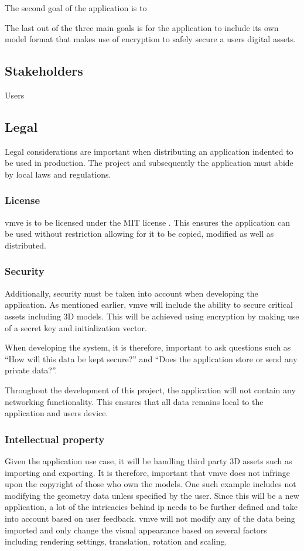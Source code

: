 \documentclass[11pt]{article}
\begin{document}
The second goal of the application is to 


The last out of the three main goals is for the application to include its own
model format that makes use of encryption to safely secure a users digital
assets.


\subsection{Stakeholders}
Users



\subsection{Legal}
Legal considerations are important when distributing an application indented to
be used in production. The project and subsequently the application must abide by
local laws and regulations.

\subsubsection{License}
\gls{vmve} is to be licensed under the MIT license \cite{mit}. This ensures the
application can be used without restriction allowing for it to be copied,
modified as well as distributed.

\subsubsection{Security}
Additionally, security must be taken into account when developing the
application. As mentioned earlier, \gls{vmve} will include the ability to secure
critical assets including 3D models. This will be achieved using encryption by
making use of a secret key and initialization vector.

When developing the system, it is therefore, important to ask questions such as
``How will this data be kept secure?'' and ``Does the application store or send
any private data?''. 

Throughout the development of this project, the application will not contain any
networking functionality. This ensures that all data remains local to the
application and users device.

\subsubsection{Intellectual property}
Given the application use case, it will be handling third party 3D assets such
as importing and exporting. It is therefore, important that \gls{vmve} does not
infringe upon the copyright of those who own the models. One such example
includes not modifying the geometry data unless specified by the user. Since
this will be a new application, a lot of the intricacies behind \gls{ip} needs
to be further defined and take into account based on user feedback. \gls{vmve}
will not modify any of the data being imported and only change the visual
appearance based on several factors including rendering settings, translation,
rotation and scaling. 
\end{document}
